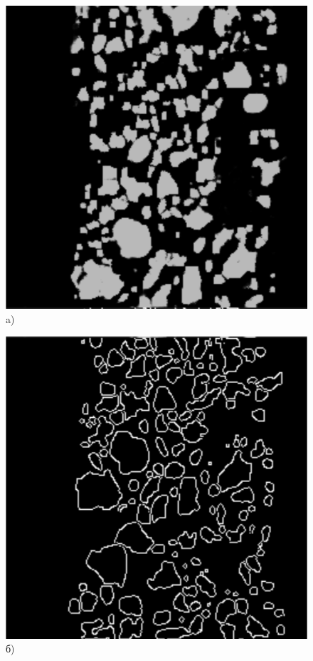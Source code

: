 \documentclass[times]{itmo-student-thesis}
\begin{document}
  \begin{figure}[h!]
 	\begin{minipage}[h]{0.3\linewidth}
 		\centering
 		\includegraphics[width=\linewidth]{images/unetmask} \\ a)
 	\end{minipage}
 	\hfill
 	\begin{minipage}[h]{0.3\linewidth}
 		\centering
 		\includegraphics[width=\linewidth]{images/unetcanny} \\ б)

\end{minipage}
\end{figure}
\end{document}
